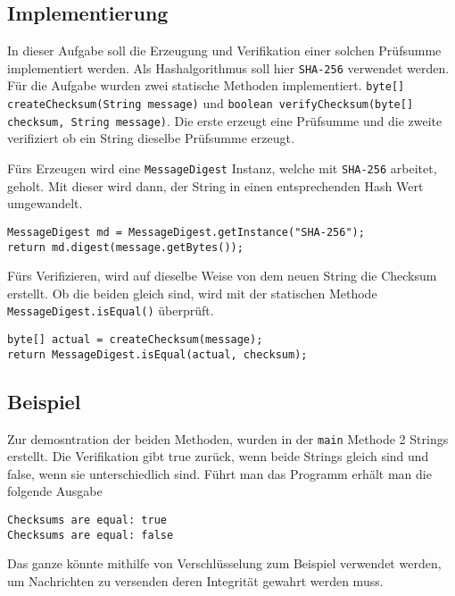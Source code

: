 \documentclass[12pt]{article}
\begin{document}
\subsection{Implementierung}
In dieser Aufgabe soll die Erzeugung und Verifikation einer solchen Prüfsumme implementiert werden. Als Hashalgorithmus soll hier \texttt{SHA-256} verwendet werden.
Für die Aufgabe wurden zwei statische Methoden implementiert. \texttt{byte[] createChecksum(String message)} und \texttt{boolean verifyChecksum(byte[] checksum, String message)}. Die erste erzeugt eine Prüfsumme und die zweite verifiziert ob ein String dieselbe Prüfsumme erzeugt.

Fürs Erzeugen wird eine \texttt{MessageDigest} Instanz, welche mit \texttt{SHA-256} arbeitet, geholt. Mit dieser wird dann, der String in einen entsprechenden Hash Wert umgewandelt.

\begin{lstlisting}
MessageDigest md = MessageDigest.getInstance("SHA-256");
return md.digest(message.getBytes());
\end{lstlisting}

Fürs Verifizieren, wird auf dieselbe Weise von dem neuen String die Checksum erstellt. Ob die beiden gleich sind, wird mit der statischen Methode \texttt{MessageDigest.isEqual()} überprüft.

\begin{lstlisting}
byte[] actual = createChecksum(message);
return MessageDigest.isEqual(actual, checksum);
\end{lstlisting}


\subsection{Beispiel}
Zur demosntration der beiden Methoden, wurden in der \texttt{main} Methode 2 Strings erstellt. Die Verifikation gibt true zurück, wenn beide Strings gleich sind und false, wenn sie unterschiedlich sind. Führt man das Programm erhält man die folgende Ausgabe

\begin{lstlisting}
Checksums are equal: true
Checksums are equal: false
\end{lstlisting}

Das ganze könnte mithilfe von Verschlüsselung zum Beispiel verwendet werden, um Nachrichten zu versenden deren Integrität gewahrt werden muss.


\end{document}
